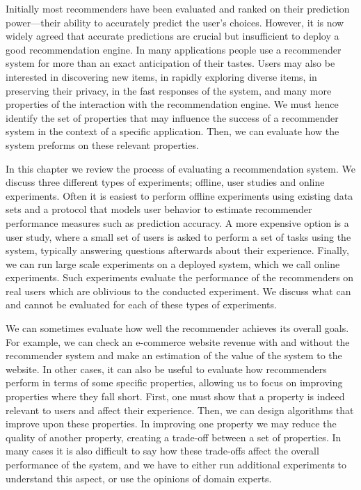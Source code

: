 Initially most recommenders have been evaluated and ranked on their prediction power—their ability to accurately predict the user’s choices. However, it is now widely agreed that accurate predictions are crucial but insufficient to deploy a good recommendation engine. In many applications people use a recommender system for more than an exact anticipation of their tastes. Users may also be interested in discovering new items, in rapidly exploring diverse items, in preserving their privacy, in the fast responses of the system, and many more properties of the interaction with the recommendation engine. We must hence identify the set of properties that may influence the success of a recommender system in the context of a specific application. Then, we can evaluate how the system preforms on these relevant properties.

In this chapter we review the process of evaluating a recommendation system. We discuss three different types of experiments; offline, user studies and online experiments.
Often it is easiest to perform offline experiments using existing data sets and a protocol that models user behavior to estimate recommender performance measures such as prediction accuracy. A more expensive option is a user study, where a small set of users is asked to perform a set of tasks using the system, typically answering questions afterwards about their experience. Finally, we can run large scale experiments on a deployed system, which we call online experiments. Such experiments evaluate the performance of the recommenders on real users which are oblivious to the conducted experiment. We discuss what can and cannot be evaluated for each of these types of experiments.

We can sometimes evaluate how well the recommender achieves its overall goals. For example, we can check an e-commerce website revenue with and without the recommender system and make an estimation of the value of the system to the website. In other cases, it can also be useful to evaluate how recommenders perform in terms of some specific properties, allowing us to focus on improving properties where they fall short. First, one must show that a property is indeed relevant to users and affect their experience. Then, we can design algorithms that improve upon these properties. In improving one property we may reduce the quality of another property, creating a trade-off between a set of properties. In many cases it is also difficult to say how these trade-offs affect the overall performance of the system, and we have to either run additional experiments to understand this aspect, or use the opinions of domain experts.

